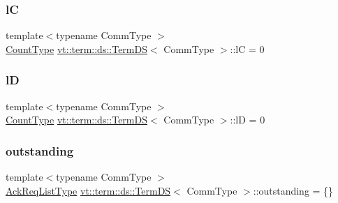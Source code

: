 \mbox{\label{structvt_1_1term_1_1ds_1_1_term_d_s_a7b24d9eb35f71de23824ea8434a52cfd}} 
\subsubsection{\texorpdfstring{lC}{lC}}
{\footnotesize\ttfamily template$<$typename Comm\+Type $>$ \\
\hyperlink{structvt_1_1term_1_1ds_1_1_term_d_s_a54f4ebd7e1ecb59c32c0f5b03ef9f20b}{Count\+Type} \hyperlink{structvt_1_1term_1_1ds_1_1_term_d_s}{vt\+::term\+::ds\+::\+Term\+DS}$<$ Comm\+Type $>$\+::lC = 0\hspace{0.3cm}{\ttfamily [protected]}}

\mbox{\label{structvt_1_1term_1_1ds_1_1_term_d_s_acd01a2b3778d0510fe35f6497f33eda9}} 
\subsubsection{\texorpdfstring{lD}{lD}}
{\footnotesize\ttfamily template$<$typename Comm\+Type $>$ \\
\hyperlink{structvt_1_1term_1_1ds_1_1_term_d_s_a54f4ebd7e1ecb59c32c0f5b03ef9f20b}{Count\+Type} \hyperlink{structvt_1_1term_1_1ds_1_1_term_d_s}{vt\+::term\+::ds\+::\+Term\+DS}$<$ Comm\+Type $>$\+::lD = 0\hspace{0.3cm}{\ttfamily [protected]}}

\mbox{\label{structvt_1_1term_1_1ds_1_1_term_d_s_a345a64aa827f72e541f9725f7ea2cbf8}} 
\subsubsection{\texorpdfstring{outstanding}{outstanding}}
{\footnotesize\ttfamily template$<$typename Comm\+Type $>$ \\
\hyperlink{structvt_1_1term_1_1ds_1_1_term_d_s_a9d4102aa0577c3b077befc48c1a88842}{Ack\+Req\+List\+Type} \hyperlink{structvt_1_1term_1_1ds_1_1_term_d_s}{vt\+::term\+::ds\+::\+Term\+DS}$<$ Comm\+Type $>$\+::outstanding = \{\}\hspace{0.3cm}{\ttfamily [protected]}}


